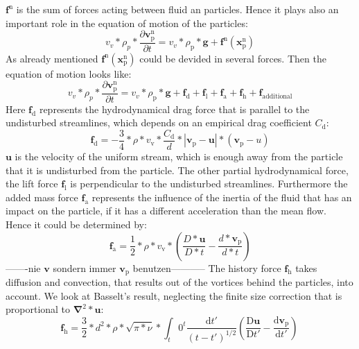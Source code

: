 \documentclass[a4paper,10pt]{article}
\renewcommand*\vec[1]{\boldsymbol{#1}}
\numberwithin{equation}{section} %
\begin{document}
$\vec{f^\mathrm{n}}$ is the sum of forces acting between fluid an particles.
Hence it plays also an important role in the equation of motion of the particles:
\begin{equation}
v_v*\rho_p* \frac{\partial{\vec{v_\mathrm{p}^\mathrm{n}}}}{\partial{t}} = v_v*\rho_\mathrm{p}*\vec{g}+\vec{f^\mathrm{n}(\vec{x_\mathrm{p}^\mathrm{n}})}
\end{equation}
As already mentioned $\vec{f^\mathrm{n}(\vec{x_\mathrm{p}^\mathrm{n}})}$ could be devided in several forces. Then the equation of motion looks like:
\begin{equation}
v_v*\rho_p* \frac{\partial{\vec{v_\mathrm{p}^\mathrm{n}}}}{\partial{t}} = v_v*\rho_\mathrm{p}*\vec{g}+\vec{f_\mathrm{d}}+\vec{f_\mathrm{l}}+\vec{f_\mathrm{a}}+\vec{f_\mathrm{h}}+\vec{f_\mathrm{additional}}
\end{equation}
Here $\vec{f_\mathrm{d}}$ represents the hydrodynamical drag force that is parallel to the undisturbed streamlines, which depends on an empirical drag coefficient $C_{\mathrm{d}} $:
\begin{equation}
\vec{f_\mathrm{d}}=-\frac{3}{4}*\rho*v_\mathrm{v}*\frac{C_\mathrm{d}}{d}*|\vec{v_\mathrm{p}}-\vec{u}|*(\vec{v_\mathrm{p}}-u)
\end{equation}
$\vec{u}$ is the velocity of the uniform stream, which is enough away from the particle that it is undisturbed from the particle.
The other partial hydrodynamical force, the lift force $\vec{f_\mathrm{l}}$ is perpendicular to the undisturbed streamlines.
Furthermore the added mass force $\vec{f_\mathrm{a}}$ represents the influence of the inertia of the fluid that has an impact on the particle, if it has a different acceleration than the mean flow.
Hence it could be determined by:
\begin{equation}
\vec{f_\mathrm{a}} =  \frac{1}{2}*\rho*v_\mathrm{v}*(\frac{D*\vec{u}}{D*t}-\frac{d*\vec{v_\mathrm{p}}}{d*t})
\end{equation}
-------nie $\vec{v}$ sondern immer $\vec{v_\mathrm{p}}$ benutzen-----------
The history force $\vec{f_\mathrm{h}}$ takes diffusion and convection, that results out of the vortices behind the particles, into account. We look at Basselt's result, neglecting the finite size correction that is proportional to $\vec\nabla^\mathrm{2}*\vec{u}$:
\begin{equation}
\vec{f_\mathrm{h}} = \frac{3}{2}*d^\mathrm{2}*\rho*\sqrt{\pi*\nu}*\int_t\mathrm{0}^t \frac{\mathrm{d}t'}{(t-t')^\mathrm{1/2}} (\frac{\mathrm{D}\vec{u}}{\mathrm{D}t'}- \frac{\mathrm{d}\vec{v_\mathrm{p}}}{\mathrm{d}t'}) \, 
\end{equation}
\end{document}
